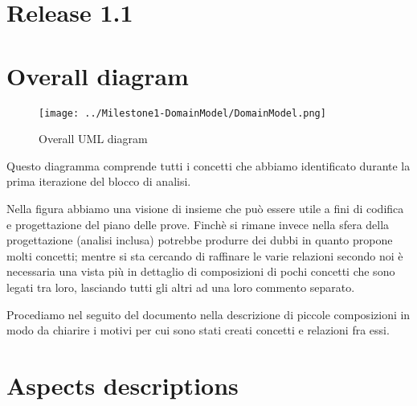 \chapter*{Release \textbf{1.1}}

\chapter{Overall diagram}

\begin{figure}[h!] 
	\centering
	\texttt{[image: ../Milestone1-DomainModel/DomainModel.png]}
	\caption{Overall UML diagram}
	\label{fig:overallDiagram} 
\end{figure}

Questo diagramma comprende tutti i concetti che abbiamo identificato durante la
prima iterazione del blocco di analisi. 

Nella figura abbiamo una visione di insieme che pu\`o essere utile a fini di
codifica e progettazione del piano delle prove. Finch\`e si rimane invece nella
sfera della progettazione (analisi inclusa) potrebbe produrre dei dubbi in
quanto propone molti concetti; mentre si sta cercando di raffinare le varie relazioni
secondo noi \`e necessaria una vista pi\`u in dettaglio di composizioni
di pochi concetti che sono legati tra loro, lasciando tutti gli altri ad una
loro commento separato.

Procediamo nel seguito del documento nella descrizione di piccole composizioni
in modo da chiarire i motivi per cui sono stati creati concetti e relazioni fra
essi.

\chapter{Aspects descriptions} 







